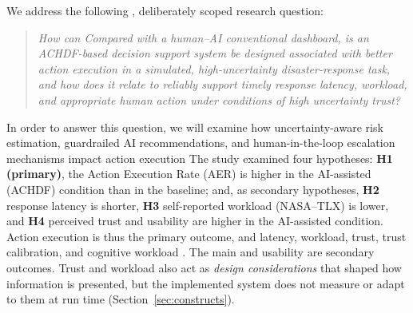 \documentclass[journal]{IEEEtran}
\theoremstyle{plain}
\theoremstyle{definition}
\providecommand{\DIFaddtex}[1]{{\protect\color{blue} \sf #1}} %
\providecommand{\DIFdeltex}[1]{{\protect\color{red} \scriptsize #1}} %
\providecommand{\DIFaddbegin}{} %
\providecommand{\DIFaddend}{} %
\providecommand{\DIFdelbegin}{} %
\providecommand{\DIFdelend}{} %
\providecommand{\DIFadd}[1]{\texorpdfstring{\DIFaddtex{#1}}{#1}} %
\providecommand{\DIFdel}[1]{\texorpdfstring{\DIFdeltex{#1}}{}} %
\newcommand{\DIFscaledelfig}{0.5}
\newlength{\DIFdelgraphicswidth} %
\newlength{\DIFdelgraphicsheight} %
\newcommand{\DIFaddincludegraphics}[2][]{{\color{blue}\fbox{\DIFOincludegraphics[#1]{#2}}}} %
\newcommand{\DIFdelincludegraphics}[2][]{%
\sbox{\DIFdelgraphicsbox}{\DIFOincludegraphics[#1]{#2}}%
\settoboxwidth{\DIFdelgraphicswidth}{\DIFdelgraphicsbox} %
\settoboxtotalheight{\DIFdelgraphicsheight}{\DIFdelgraphicsbox} %
\scalebox{\DIFscaledelfig}{%
\parbox[b]{\DIFdelgraphicswidth}{\usebox{\DIFdelgraphicsbox}\\[-\baselineskip] \rule{\DIFdelgraphicswidth}{0em}}\llap{\resizebox{\DIFdelgraphicswidth}{\DIFdelgraphicsheight}{%
\setlength{\unitlength}{\DIFdelgraphicswidth}%
\begin{picture}(1,1)%
\thicklines\linethickness{2pt} %
{\color[rgb]{1,0,0}\put(0,0){\framebox(1,1){}}}%
{\color[rgb]{1,0,0}\put(0,0){\line( 1,1){1}}}%
{\color[rgb]{1,0,0}\put(0,1){\line(1,-1){1}}}%
\end{picture}%
}\hspace*{3pt}}} %
} %
\DeclareRobustCommand{\DIFaddbegin}{\DIFOaddbegin \let\includegraphics\DIFaddincludegraphics} %
\DeclareRobustCommand{\DIFaddend}{\DIFOaddend \let\includegraphics\DIFOincludegraphics} %
\DeclareRobustCommand{\DIFdelbegin}{\DIFOdelbegin \let\includegraphics\DIFdelincludegraphics} %
\DeclareRobustCommand{\DIFdelend}{\DIFOaddend \let\includegraphics\DIFOincludegraphics} %
\begin{document}
\DIFadd{We }\DIFaddend address the following\DIFaddbegin \DIFadd{, deliberately scoped }\DIFaddend research question:
\begin{quote}
    \emph{\DIFdelbegin \DIFdel{How can }\DIFdelend \DIFaddbegin \DIFadd{Compared with }\DIFaddend a \DIFdelbegin \DIFdel{human--AI }\DIFdelend \DIFaddbegin \DIFadd{conventional dashboard, is an ACHDF-based }\DIFaddend decision \DIFaddbegin \DIFadd{support }\DIFaddend system \DIFdelbegin \DIFdel{be designed }\DIFdelend \DIFaddbegin \DIFadd{associated with better action execution in a simulated, high-uncertainty disaster-response task, and how does it relate }\DIFaddend to \DIFdelbegin \DIFdel{reliably support timely }\DIFdelend \DIFaddbegin \DIFadd{response latency, workload, }\DIFaddend and \DIFdelbegin \DIFdel{appropriate human action under conditions of high uncertainty}\DIFdelend \DIFaddbegin \DIFadd{trust}\DIFaddend ?}
\end{quote}
\DIFdelbegin \DIFdel{In order to answer this question, we will examine how uncertainty-aware risk estimation, guardrailed AI recommendations, and human-in-the-loop escalation mechanisms impact action execution }\DIFdelend \DIFaddbegin \DIFadd{The study examined four hypotheses: \textbf{H1 (primary)}, the Action Execution Rate (AER) is higher in the AI-assisted (ACHDF) condition than in the baseline; and, as secondary hypotheses, \textbf{H2} response latency is shorter, \textbf{H3} self-reported workload (NASA--TLX) is lower, and \textbf{H4} perceived trust and usability are higher in the AI-assisted condition. Action execution is thus the primary outcome, and latency, workload, trust}\DIFaddend , \DIFdelbegin \DIFdel{trust calibration, and cognitive workload \cite{McAllister2017IJCAI,Weidinger2022FAccT,Assaad2023TAS,Miller2019XRDS}.
The main }\DIFdelend \DIFaddbegin \DIFadd{and usability are secondary outcomes. Trust and workload also act as \emph{design considerations} that shaped how information is presented, but the implemented system does not measure or adapt to them at run time (Section~\ref{sec:constructs}).
}
\end{document}
